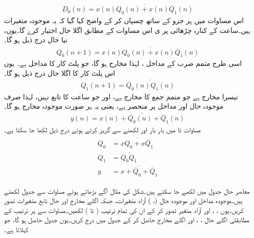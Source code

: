 \begin{align*}
D_0(n)=\overline{x(n) Q_0(n) +x(n) \overline{Q}_1(n)}  
\end{align*}
اس مساوات میں ہر جزو کے ساتھ  چسپاں کر کے  واضح کیا گیا کہ یہ موجودہ متغیرات ہیں۔ساعت کے کنارہ چڑھائی پر ی   اس مساوات کے مطابق اگلا حال اختیار کرے گا۔یوں،  نیا حال  درج ذیل ہو گا۔
\begin{align}\label{مساوات_ترتیبی_مثال_ترتیبی_دور_الف}
Q_0(n+1)=\overline{x(n) Q_0(n) +x(n) \overline{Q}_1(n)}  
\end{align}
اسی طرح متمم ضرب  کے مداخل ،  لہٰذا مخارج  ہو گا، جو پلٹ کار  کا مداخل  ہے۔ یوں اس پلٹ کار کا اگلا حال درج ذیل ہو گا۔
\begin{align}\label{مساوات_ترتیبی_مثال_ترتیبی_دور_ب}
Q_1(n+1)=\overline{\overline{Q}_0(n)Q_1(n)}
\end{align}
تیسرا مخارج  ہے جو  متمم جمع  کا مخارج   ہے، اور جو ساعت  کا تابع نہیں، لہٰذا   صرف موجودہ حال اور مداخل پر منحصر ہے، یعنی   یہ ہر  صورت  موجودہ مخارج  ہو گا۔
\begin{align}\label{مساوات_ترتیبی_مثال_ترتیبی_دور_پ}
y(n)=\overline{x(n)+\overline{Q}_0(n)+\overline{Q}_1(n)}
\end{align}
مساوات  تا  میں بار بار  اور  لکھنے سے گریز کرتے ہوئے درج ذیل لکھا جا سکتا ہے۔
\begin{gather}
\begin{aligned}\label{مساوات_ترتیبی_مثال_ترتیبی_دور_ت}
Q_0&=\overline{x Q_0 +x \overline{Q}_1}  \\
Q_1&=\overline{\overline{Q}_0Q_1}\\
y&=\overline{x+\overline{Q}_0+\overline{Q}_1}
\end{aligned}
\end{gather}


معاصر   حال   جدول  میں لکھے جا سکتے ہیں۔شکل    کی مثال آگے بڑھاتے  ہوئے   مساوات  سے جدول لکھتے ہیں۔موجودہ   مداخل  اور  موجودہ حال (، )   آزاد متغیرات، جبکہ اگلے مخارج اور    حال    تابع متغیرات  تصور کریں۔یوں   ،  ، اور  آزاد متغیر  تصور کر کے ان کی تمام ترتیب   ( تا )  لکھیں۔مساوات    سے ہر ترتیب  کے مطابقتی  اگلے حال  ، ،  اور اگلے مخارج   حاصل کر کے جدول میں درج  کریں۔یوں    جدول  حاصل ہو گا، جو  کہلاتا ہے۔

